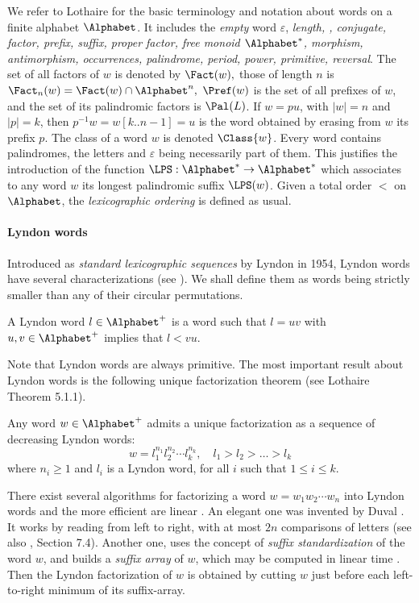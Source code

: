 We refer to Lothaire \cite{lothaire1} for the basic terminology and notation about words on a finite alphabet $\Alphabet$. It includes  the {\it empty} word $\varepsilon$, {\it length, , conjugate, factor, prefix, suffix, proper factor,  free monoid $\Alphabet^*$,  morphism, antimorphism, occurrences, palindrome, period, power, primitive, reversal}.
The set of all factors of $w$ is denoted by  $\Fact(w),$  those of
length  $n$ is $\Fact_n(w) = \Fact(w) \cap \Alphabet^n,$ $\Pref(w)$ is
the set of all prefixes of $w$, and  the set of its palindromic factors is $\Pal(L)$.  If $w=pu$, with $|w|=n$ and $|p|=k$, then 
$p^{-1}w = w[k..n-1] = u$ is the word obtained by erasing from $w$ its prefix $p$.
The  class of a word $w$ is denoted $\Class{w}$. Every  word contains palindromes, the letters and $\varepsilon$ being necessarily part of them. This justifies the introduction of the function $\LPS : \Alphabet^* \to \Alphabet^*$ which associates  to any  word $w$  its longest palindromic suffix $\LPS(w)$.
Given a  total order $<$ on $\Alphabet$, the \emph{lexicographic ordering} is defined as usual. 
\paragraph{Lyndon words}
Introduced as \emph{standard lexicographic sequences} by Lyndon in 1954, Lyndon words have several characterizations (see \cite{lothaire1}). We shall define them as words being strictly smaller than any of their circular permutations. 
\begin{definition}
A Lyndon word $l \in \Alphabet^+$ is a word such that $l = uv$ with $u,v \in \Alphabet^+$ implies that $l<vu$. 
\end{definition}

Note that Lyndon words are always primitive. The most important result about Lyndon words is the following unique factorization theorem (see Lothaire \cite{lothaire1} Theorem 5.1.1).
\begin{theorem}  Any word $w\in \Alphabet^+$  admits a unique factorization as a sequence of decreasing Lyndon words:
\begin{equation}\label{factoLyndon}
w = l_1^{n_1} l_2^{n_2} \cdots l_k^{n_k}, \quad l_1 > l_2 > \dots > l_k
\end{equation}
where  $n_i\geq 1$ and $l_i$ is a Lyndon word, for all $i$ such that $1\leq i\leq k$. 
\end{theorem}
There exist several algorithms for factorizing a word $w=w_1w_2\cdots w_n$ into Lyndon words and the more efficient are linear . 
An  elegant one was invented by Duval \cite{Duv}. It works by reading from left to right, with at most $2n$ comparisons of letters (see also \cite{Reu}, Section 7.4). 
Another one, uses the concept of \emph{suffix standardization} of the word $w$, and builds a \emph{suffix array} of $w$, which may be computed in linear time \cite{CroHanLec}. Then the Lyndon factorization of $w$ is obtained by cutting $w$ just before each left-to-right minimum of its suffix-array.




